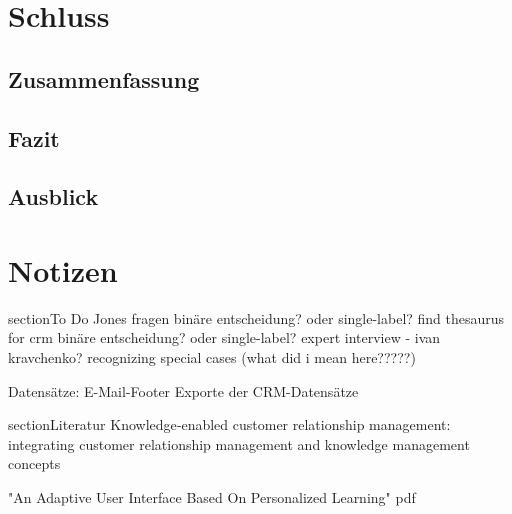 \chapter{Schluss}
\section{Zusammenfassung}
\section{Fazit}
\section{Ausblick}

\chapter{Notizen}

section{To Do}
Jones fragen
binäre entscheidung? oder single-label?
find thesaurus for crm
binäre entscheidung? oder single-label?
expert interview - ivan kravchenko?
recognizing special cases (what did i mean here?????)

Datensätze:
E-Mail-Footer
Exporte der CRM-Datensätze

section{Literatur}
Knowledge‐enabled customer relationship management: integrating customer relationship management and knowledge management concepts

"An Adaptive User Interface Based On Personalized Learning" pdf
